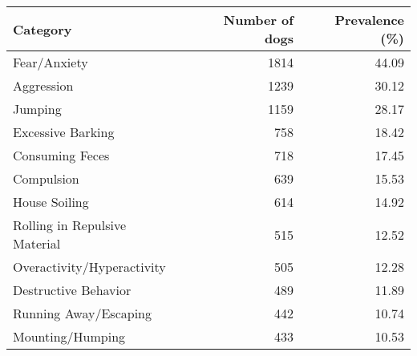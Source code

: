 \begin{tabular}{lrr}
\toprule
Category &  Number of dogs &  Prevalence (\%) \\
\midrule
Fear/Anxiety                  &            1814 &           44.09 \\
Aggression                    &            1239 &           30.12 \\
Jumping                       &            1159 &           28.17 \\
Excessive Barking             &             758 &           18.42 \\
Consuming Feces               &             718 &           17.45 \\
Compulsion                    &             639 &           15.53 \\
House Soiling                 &             614 &           14.92 \\
Rolling in Repulsive Material &             515 &           12.52 \\
Overactivity/Hyperactivity    &             505 &           12.28 \\
Destructive Behavior          &             489 &           11.89 \\
Running Away/Escaping         &             442 &           10.74 \\
Mounting/Humping              &             433 &           10.53 \\
\bottomrule
\end{tabular}
